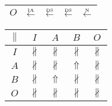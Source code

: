 \begin{table}[htbp]
\begin{subtable}{1\textwidth}
\begin{minipage}[b]{0.3\textwidth}
\begin{tabular}{|c|c|c|c|c|}
        $O$ & \cellcolor{lightgray}$\overset{\text{\tiny{IA}}}{\leftarrow}$ & $\overset{\text{\tiny{DS}}}{\leftarrow}$ & $\overset{\text{\tiny{DS}}}{\leftarrow}$ & $\overset{\text{\tiny{N}}}{\leftarrow}$\\ \hline
      \end{tabular}
    \end{minipage}
    \begin{minipage}[b]{0.3\textwidth}
      \centering
      \begin{tabular}{|c|c|c|c|c|} \hline
        $\parallel$ & $I$ & $A$ & $B$ & $O$\\ \hline
        $I$ & $\nparallel$ & $\nparallel$ & $\nparallel$ & $\nparallel$\\ \hline
        $A$ & $\nparallel$ & $\nparallel$ & $\Uparrow$ & $\nparallel$\\ \hline
        $B$ & $\nparallel$ & $\Uparrow$ & $\nparallel$ & $\nparallel$\\ \hline
        $O$ & $\nparallel$ & $\nparallel$ & $\nparallel$ & $\nparallel$\\ \hline
      \end{tabular}
    \end{minipage}
  \end{subtable}


\end{table}

